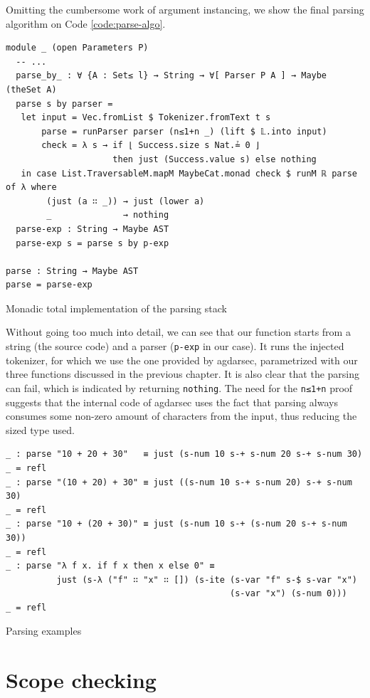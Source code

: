 Omitting the cumbersome work of argument instancing, we show the final parsing algorithm on Code \ref{code:parse-algo}.

\begin{listing}[H]
\begin{verbatim}
module _ (open Parameters P)
  -- ...
  parse_by_ : ∀ {A : Set≤ l} → String → ∀[ Parser P A ] → Maybe (theSet A)
  parse s by parser =
   let input = Vec.fromList $ Tokenizer.fromText t s
       parse = runParser parser (n≤1+n _) (lift $ 𝕃.into input)
       check = λ s → if ⌊ Success.size s Nat.≟ 0 ⌋
                     then just (Success.value s) else nothing
   in case List.TraversableM.mapM MaybeCat.monad check $ runM ℝ parse of λ where
        (just (a ∷ _)) → just (lower a)
        _              → nothing
  parse-exp : String → Maybe AST
  parse-exp s = parse s by p-exp

parse : String → Maybe AST
parse = parse-exp
\end{verbatim}
\caption{Monadic total implementation of the parsing stack}
\label{code:parse-algo}
\end{listing}

Without going too much into detail, we can see that our function starts from a string (the source code) and a parser (\verb$p-exp$ in our case). It runs the injected tokenizer, for which we use the one provided by agdarsec, parametrized with our three functions discussed in the previous chapter. It is also clear that the parsing can fail, which is indicated by returning \verb$nothing$. The need for the \verb$n≤1+n$ proof suggests that the internal code of agdarsec uses the fact that parsing always consumes some non-zero amount of characters from the input, thus reducing the sized type used.

\begin{listing}[H]
\begin{verbatim}
_ : parse "10 + 20 + 30"   ≡ just (s-num 10 s-+ s-num 20 s-+ s-num 30)
_ = refl
_ : parse "(10 + 20) + 30" ≡ just ((s-num 10 s-+ s-num 20) s-+ s-num 30)
_ = refl
_ : parse "10 + (20 + 30)" ≡ just (s-num 10 s-+ (s-num 20 s-+ s-num 30))
_ = refl
_ : parse "λ f x. if f x then x else 0" ≡
          just (s-λ ("f" ∷ "x" ∷ []) (s-ite (s-var "f" s-$ s-var "x")
                                            (s-var "x") (s-num 0)))
_ = refl
\end{verbatim}
\caption{Parsing examples}
\label{code:parse-examples}
\end{listing}

\section{Scope checking}

